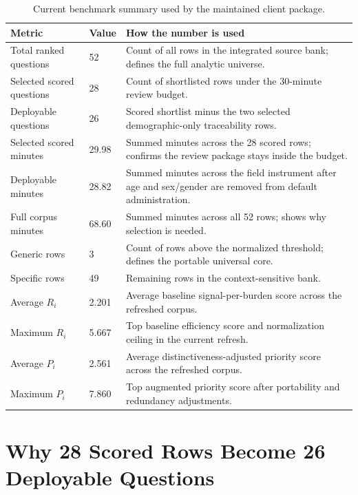 \documentclass[12pt]{article}
\begin{document}
\begin{table}[H]
\centering
\footnotesize
\begin{tabularx}{\textwidth}{L{0.25\textwidth} R{0.10\textwidth} Y}
\toprule
Metric & Value & How the number is used \\
\midrule
Total ranked questions & 52 & Count of all rows in the integrated source bank; defines the full analytic universe. \\
Selected scored questions & 28 & Count of shortlisted rows under the 30-minute review budget. \\
Deployable questions & 26 & Scored shortlist minus the two selected demographic-only traceability rows. \\
Selected scored minutes & 29.98 & Summed minutes across the 28 scored rows; confirms the review package stays inside the budget. \\
Deployable minutes & 28.82 & Summed minutes across the field instrument after age and sex/gender are removed from default administration. \\
Full corpus minutes & 68.60 & Summed minutes across all 52 rows; shows why selection is needed. \\
Generic rows & 3 & Count of rows above the normalized threshold; defines the portable universal core. \\
Specific rows & 49 & Remaining rows in the context-sensitive bank. \\
Average $R_i$ & 2.201 & Average baseline signal-per-burden score across the refreshed corpus. \\
Maximum $R_i$ & 5.667 & Top baseline efficiency score and normalization ceiling in the current refresh. \\
Average $P_i$ & 2.561 & Average distinctiveness-adjusted priority score across the refreshed corpus. \\
Maximum $P_i$ & 7.860 & Top augmented priority score after portability and redundancy adjustments. \\
\bottomrule
\end{tabularx}
\caption{Current benchmark summary used by the maintained client package.}
\end{table}

\section{Why 28 Scored Rows Become 26 Deployable Questions}
\end{document}
